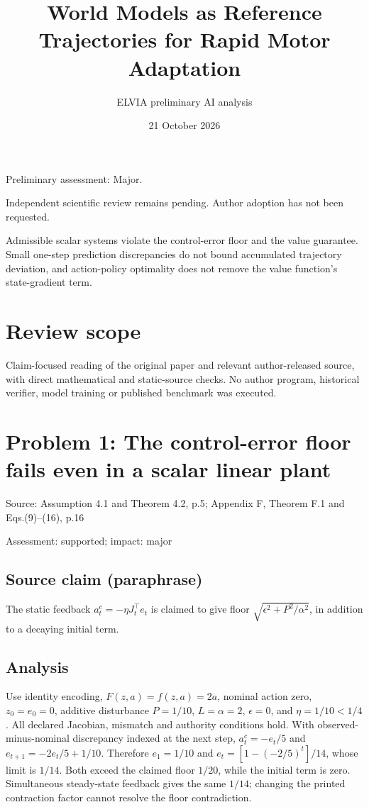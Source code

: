 \documentclass[11pt]{article}
\begin{document}
\title{World Models as Reference Trajectories for Rapid Motor Adaptation}

\author{ELVIA preliminary AI analysis}\date{21 October 2026}\maketitle

Preliminary assessment: Major.\par

Independent scientific review remains pending. Author adoption has not been requested.

Admissible scalar systems violate the control-error floor and the value guarantee. Small one-step prediction discrepancies do not bound accumulated trajectory deviation, and action-policy optimality does not remove the value function’s state-gradient term.

\section*{Review scope}

Claim-focused reading of the original paper and relevant author-released source, with direct mathematical and static-source checks. No author program, historical verifier, model training or published benchmark was executed.

\section*{Problem 1: The control-error floor fails even in a scalar linear plant}

Source: Assumption 4.1 and Theorem 4.2, p.5; Appendix F, Theorem F.1 and Eqs.(9)–(16), p.16

Assessment: supported; impact: major

\subsection*{Source claim (paraphrase)}

The static feedback \(a_t^c=-\eta J_t^{\top}e_t\) is claimed to give floor \(\sqrt{\epsilon^2+P^2/\alpha^2}\), in addition to a decaying initial term.

\subsection*{Analysis}

Use identity encoding, \(F(z,a)=f(z,a)=2a\), nominal action zero, \(z_0=e_0=0\), additive disturbance \(P=1/10\), \(L=\alpha=2\), \(\epsilon=0\), and \(\eta=1/10<1/4\). All declared Jacobian, mismatch and authority conditions hold. With observed-minus-nominal discrepancy indexed at the next step, \(a_t^c=-e_t/5\) and \(e_{t+1}=-2e_t/5+1/10\). Therefore \(e_1=1/10\) and \(e_t=[1-(-2/5)^t]/14\), whose limit is \(1/14\). Both exceed the claimed floor \(1/20\), while the initial term is zero. Simultaneous steady-state feedback gives the same \(1/14\); changing the printed contraction factor cannot resolve the floor contradiction.
\end{document}
